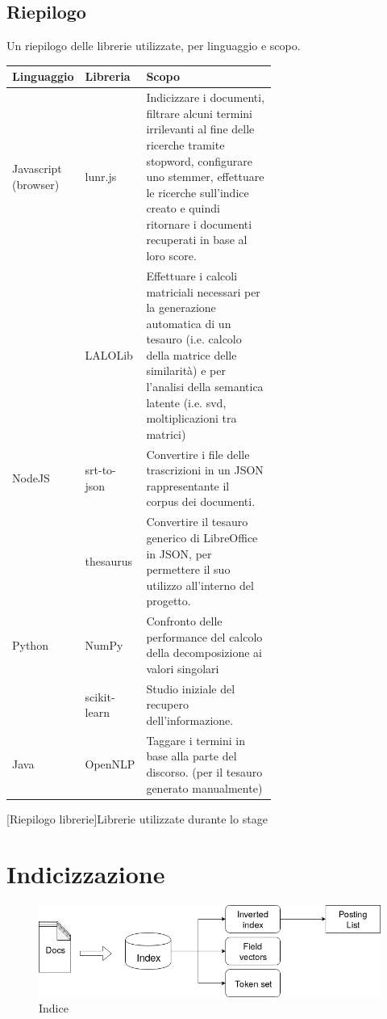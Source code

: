 \subsection{Riepilogo}
 Un riepilogo delle librerie utilizzate, per linguaggio e scopo.
 \begin{center}
    \begin{tabular}{p{0.15\linewidth}lp{0.5\linewidth}}
        \toprule
        Linguaggio & Libreria & Scopo \\
        \midrule
          Javascript (browser) & lunr.js & Indicizzare i documenti, filtrare alcuni termini irrilevanti al fine delle ricerche tramite stopword, configurare uno stemmer, effettuare le ricerche sull'indice creato e quindi ritornare i documenti recuperati in base al loro score. \\
           & LALOLib & Effettuare i calcoli matriciali necessari per la generazione automatica di un tesauro (i.e. calcolo della matrice delle similarità) e per l'analisi della semantica latente (i.e. \gls{svd}, moltiplicazioni tra matrici) \\
           \addlinespace
          NodeJS &  srt-to-json & Convertire i file delle trascrizioni in un JSON rappresentante il \gls{corpus} dei documenti. \\
                 &  thesaurus & Convertire il tesauro generico di LibreOffice in JSON, per permettere il suo utilizzo all'interno del progetto.\\
        \addlinespace
          Python & NumPy        & Confronto delle performance del calcolo della decomposizione ai valori singolari \\
                 & scikit-learn & Studio iniziale del recupero dell'informazione.\\
        \addlinespace
          Java   & OpenNLP      & Taggare i termini in base alla parte del discorso. (per il tesauro generato manualmente)\\
        \bottomrule
    \end{tabular}
        [Riepilogo librerie]{Librerie utilizzate durante lo stage} 
        \label{tab:librerieUsate}
    \end{center}
\newpage
\section{Indicizzazione}
\begin{figure}
    \centering
    \includegraphics[scale=0.42]{immagini/indice.png}
    \caption{Indice}
    \label{fig:indice}
\end{figure}
    

